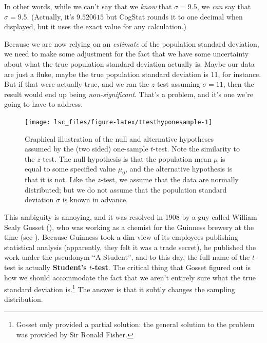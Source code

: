 \documentclass[
  11pt,
  a4paper,
  twoside,symmetric,openright]{book}
\theoremstyle{break}
\theoremstyle{break}
\begin{document}
In other words, while we can't say that we \emph{know} that \(\sigma = 9.5\), we \emph{can} say that \(\hat\sigma = 9.5\). (Actually, it's \(9.520615\) but CogStat rounds it to one decimal when displayed, but it uses the exact value for any calculation.)

Because we are now relying on an \emph{estimate} of the population standard deviation, we need to make some adjustment for the fact that we have some uncertainty about what the true population standard deviation actually is. Maybe our data are just a fluke, maybe the true population standard deviation is 11, for instance. But if that were actually true, and we ran the \(z\)-test assuming \(\sigma=11\), then the result would end up being \emph{non-significant}. That's a problem, and it's one we're going to have to address.

\begin{figure}

{\centering \texttt{[image: lsc\_files/figure-latex/ttesthyponesample-1]} 

}

\caption{Graphical illustration of the null and alternative hypotheses assumed by the (two sided) one-sample $t$-test. Note the similarity to the $z$-test. The null hypothesis is that the population mean $\mu$ is equal to some specified value $\mu_0$, and the alternative hypothesis is that it is not. Like the $z$-test, we assume that the data are normally distributed; but we do not assume that the population standard deviation $\sigma$ is known in advance.}\label{fig:ttesthyponesample}
\end{figure}

This ambiguity is annoying, and it was resolved in 1908 by a guy called William Sealy Gosset (), who was working as a chemist for the Guinness brewery at the time (see ). Because Guinness took a dim view of its employees publishing statistical analysis (apparently, they felt it was a trade secret), he published the work under the pseudonym ``A Student'', and to this day, the full name of the \(t\)-test is actually \textbf{Student's \(t\)-test}. The critical thing that Gosset figured out is how we should accommodate the fact that we aren't entirely sure what the true standard deviation is.\footnote{Gosset only provided a partial solution: the general solution to the problem was provided by Sir Ronald Fisher.} The answer is that it subtly changes the sampling distribution.
\end{document}
